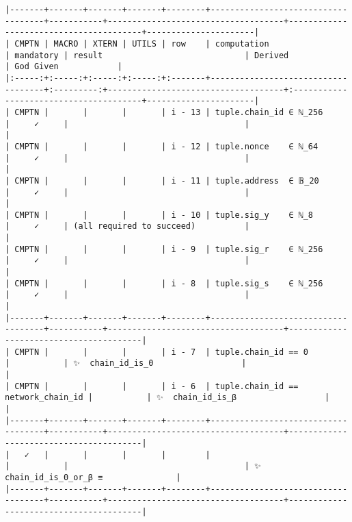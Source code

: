 \documentclass[varwidth=\maxdimen,margin=0.5cm,multi={verbatim}]{standalone}
\begin{document}
\begin{verbatim}
|-------+-------+-------+-------+--------+------------------------------------+-----------+------------------------------------+----------------------------------------+----------------------|
| CMPTN | MACRO | XTERN | UTILS | row    | computation                        | mandatory | result                             | Derived                                | God Given            |
|:-----:+:-----:+:-----:+:-----:+:-------+------------------------------------+:---------:+------------------------------------+:---------------------------------------+----------------------|
| CMPTN |       |       |       | i - 13 | tuple.chain_id ∈ ℕ_256             |     ✓     |                                    |                                        |
| CMPTN |       |       |       | i - 12 | tuple.nonce    ∈ ℕ_64              |     ✓     |                                    |                                        |
| CMPTN |       |       |       | i - 11 | tuple.address  ∈ 𝔹_20              |     ✓     |                                    |                                        |
| CMPTN |       |       |       | i - 10 | tuple.sig_y    ∈ ℕ_8               |     ✓     | (all required to succeed)          |                                        |
| CMPTN |       |       |       | i - 9  | tuple.sig_r    ∈ ℕ_256             |     ✓     |                                    |                                        |
| CMPTN |       |       |       | i - 8  | tuple.sig_s    ∈ ℕ_256             |     ✓     |                                    |                                        |
|-------+-------+-------+-------+--------+------------------------------------+-----------+------------------------------------+----------------------------------------|
| CMPTN |       |       |       | i - 7  | tuple.chain_id == 0                |           | ✨  chain_id_is_0                  |                                        |
| CMPTN |       |       |       | i - 6  | tuple.chain_id == network_chain_id |           | ✨  chain_id_is_β                  |                                        |
|-------+-------+-------+-------+--------+------------------------------------+-----------+------------------------------------+----------------------------------------|
|   ✓   |       |       |       |        |                                    |           |                                    | ✨  chain_id_is_0_or_β ≡               |
|-------+-------+-------+-------+--------+------------------------------------+-----------+------------------------------------+----------------------------------------|

\end{verbatim}
\end{document}
